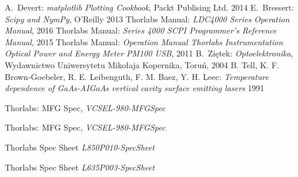 \begin{thebibliography}{99}
  A.~Devert:
\emph{matplotlib Plotting Cookbook},
Packt Publising Ltd. 2014
 E.~Bressert:
\emph{Scipy and NymPy},
O'Reilly 2013
 Thorlabs Manual:
\emph{LDC4000 Series Operation Manual},
2016
 Thorlabs Manual:
\emph{Series 4000 SCPI Programmer's Reference Manual},
2015
 Thorlabs Manual:
\emph{Operation Manual
Thorlabs Instrumentation Optical Power and Energy Meter PM100 USB},
2011
  B.~Ziętek:
\emph{Optoelektronika},
Wydawnictwo Uniwersytetu Mikołaja Kopernika, Toruń, 2004
 B. Tell, K. F. Brown-Goebeler, R. E. Leibenguth, F. M.  Baez, Y. H. Leec:
\emph{Temperature dependence of GaAs-AIGaAs vertical cavity surface emitting lasers }
1991

 Thorlabs:
MFG Spec,
\emph{VCSEL-980-MFGSpec}

 Thorlabs:
MFG Spec,
\emph{VCSEL-980-MFGSpec}

 Thorlabs
Spec Sheet
\emph{L850P010-SpecSheet}

 Thorlabs
Spec Sheet
\emph{L635P003-SpecSheet}
\end{thebibliography}
